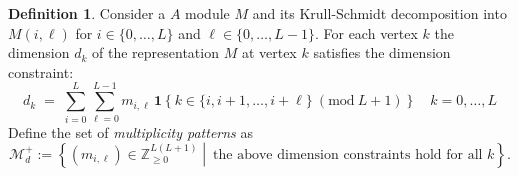 \documentclass{article}
\theoremstyle{definition}
\newtheorem{definition}[theorem]{Definition}
\begin{document}

\begin{definition}
    Consider a $A$ module $M$ and its Krull-Schmidt decomposition into $M(i,\ell)$ for $i\in\{0,\dots,L\}$ and $\ell\in\{0,\dots,L-1\}$. For each vertex $k$ the dimension $d_k$ of the representation $M$ at vertex $k$ satisfies the dimension constraint:
\[d_k \;=\;
\sum_{i=0}^{L}\sum_{\ell=0}^{L-1}
m_{i,\ell}\,\mathbf{1}\!\left\{
k \in \{i,i+1,\dots,i+\ell\} \ (\mathrm{mod}\ L+1)
\right\}\quad k=0,\dots,L\]
Define the set of \emph{multiplicity patterns} as
\[\mathcal M_d^+ := \left\{(m_{i,\ell})\in \mathbb{Z}_{\ge 0}^{L(L+1)}\middle|\ \text{the above dimension constraints hold for all }k\right\}.\]
\end{definition}
\end{document}
